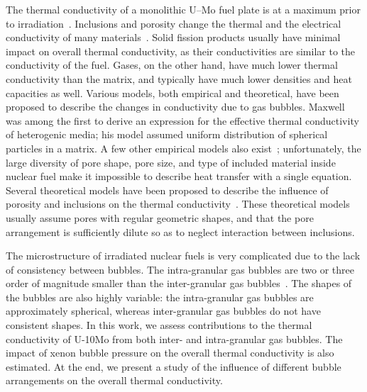 The thermal conductivity of a monolithic U--Mo fuel plate is at a maximum prior to irradiation~\cite{burkes2015thermal}.
Inclusions and porosity change the thermal and the electrical conductivity of many materials~\cite{bakker1997using}. 
Solid fission products usually have minimal impact on overall thermal conductivity, as their conductivities are similar to the conductivity of the fuel. Gases, on the other hand, have much lower thermal conductivity than
the matrix, and typically have much lower densities and heat capacities as well. Various models, both empirical and theoretical, have been proposed to describe the changes in conductivity due to gas bubbles. Maxwell~\cite{maxwell1881treatise} was among the first to derive an expression for the effective thermal conductivity of heterogenic media; his model assumed uniform distribution of spherical particles in a matrix. A few other empirical models also exist~\cite{macewan1967effect,goldsmith1973measurements,devries1989experimental}; unfortunately, the large diversity of pore shape, pore size, and type of included material inside nuclear fuel make it impossible to describe heat transfer with a single equation. Several theoretical models have been proposed to describe the influence of porosity and inclusions on the thermal conductivity~\cite{maxwell1881treatise,loeb1954thermal, cunningham1981heat, tzou1991effect, bauer1993general}. These theoretical models usually assume pores with regular geometric shapes, and that the pore arrangement is sufficiently dilute so as to neglect interaction between inclusions.

The microstructure of irradiated nuclear fuels is very complicated due to the lack of consistency between bubbles. The intra-granular gas bubbles are two or three order of magnitude smaller than the inter-granular gas bubbles~\cite{hu2015assessment}. The shapes of the bubbles are also highly variable: the intra-granular gas bubbles are approximately spherical, whereas inter-granular gas bubbles do not have consistent shapes. In this work, we assess contributions to the thermal conductivity of U-10Mo from both inter- and intra-granular gas bubbles. The impact of xenon bubble pressure on the overall thermal conductivity is also estimated. At the end, we present a study of the influence of different bubble arrangements on the overall thermal conductivity.

